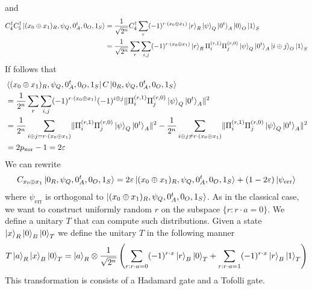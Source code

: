 \documentclass{article}
\begin{document}
and
\begin{align}
    C_{4}^{\dagger}C_{5}^{\dagger}\ket{(x_{0}\oplus x_{1})_{R},\psi_{Q},0^{t}_{A},0_{O},1_{S}} &= \frac{1}{\sqrt{2^{n}}}C_{4}^{\dagger}\sum_{r}(-1)^{r\cdot (x_{0}\oplus x_{1})}\ket{r}_{R}\ket{\psi}_{Q}\ket{0^{t}}_{A}\ket{0}_{O}\ket{1}_{S}\\&=\frac{1}{\sqrt{2^{n}}}\sum_{r}\sum_{i,j}(-1)^{r\cdot (x_{0}\oplus x_{1})}\ket{r}_{R}\Pi_{i}^{(r,1)}\Pi_{j}^{(r,0)}\ket{\psi}_{Q}\ket{0^{t}}_{A}\ket{i\oplus j}_{O}\ket{1}_{S}\end{align}
If follows that
\begin{align}
    &\bra{(x_{0}\oplus x_{1})_{R},\psi_{Q},0^{t}_{A},0_{O},1_{S}}C\ket{0_{R},\psi_{Q},0^{t}_{A},0_{O},1_{S}}\\
    &=\frac{1}{2^{n}}\sum_{r}\sum_{i,j}(-1)^{r\cdot (x_{0}\oplus x_{1})}(-1)^{i\oplus j} \lVert \Pi_{i}^{(r,1)}\Pi_{j}^{(r,0)}\ket{\psi}_{Q}\ket{0^{t}}_{A}\rVert^{2}\\
    &=\frac{1}{2^{n}}\sum_{i\oplus j = r\cdot (x_{0}\oplus x_{1})}\lVert \Pi_{i}^{(r,1)}\Pi_{j}^{(r,0)}\ket{\psi}_{Q}\ket{0^{t}}_{A}\rVert^{2} - \frac{1}{2^{n}}\sum_{i\oplus j \neq r\cdot (x_{0}\oplus x_{1})}\lVert \Pi_{i}^{(r,1)}\Pi_{j}^{(r,0)}\ket{\psi}_{Q}\ket{0^{t}}_{A}\rVert^{2}\\
    &=2p_{\mathrm{xor}} - 1= 2\varepsilon
\end{align} 
We can rewrite \begin{align}C_{x_{0}\oplus x_{1}}\ket{0_{R},\psi_{Q},0^{t}_{A},0_{O},1_{S}} = 2\varepsilon\ket{(x_{0}\oplus x_{1})_{R},\psi_{Q},0^{t}_{A},0_{O},1_{S}} + (1-2\varepsilon)\ket{\psi_{\mathrm{err}}}\end{align} where $\psi_{\mathrm{err}}$ is orthogonal to $\ket{(x_{0}\oplus x_{1})_{R},\psi_{Q},0^{t}_{A},0_{O},1_{S}}$. As in the classical case, we want to construct uniformly random $r$ on the subspace $\{r: r\cdot a = 0\}$. We define a unitary $T$ that can compute such distributions. Given a state $\ket{x}_{R}\ket{0}_{B}\ket{0}_{T}$ we define the unitary $T$ in the following manner \begin{align}
    T\ket{a}_{R}\ket{x}_{B}\ket{0}_{T} =  \ket{a}_{R}\otimes \frac{1}{\sqrt{2^{n}}}\left(\sum_{r: r\cdot a = 0}(-1)^{r\cdot x}\ket{r}_{B}\ket{0}_{T} + \sum_{r: r\cdot a = 1}(-1)^{r\cdot x}\ket{r}_{B}\ket{1}_{T} \right)
\end{align} This transformation is consists of a Hadamard gate and a Tofolli gate.

\end{document}
